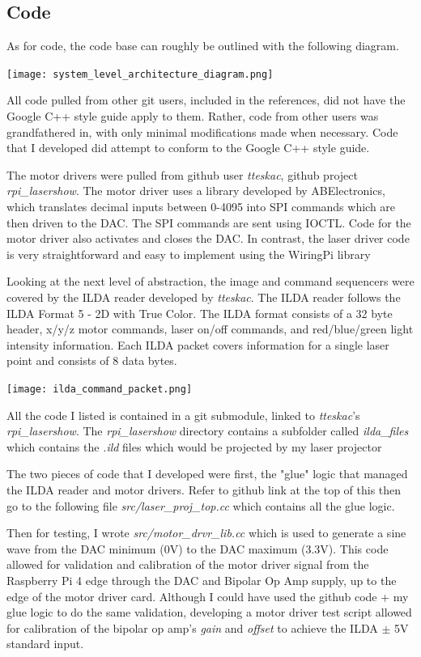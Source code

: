 \documentclass[journal]{IEEEtran}
\begin{document}
    \subsection{Code}

    As for code, the code base can roughly be outlined with the following diagram.

    \texttt{[image: system\_level\_architecture\_diagram.png]}

    All code pulled from other git users, included in the references, did not have the Google C++ style guide apply to them.
    Rather, code from other users was grandfathered in, with only minimal modifications made when necessary.
    Code that I developed did attempt to conform to the Google C++ style guide.

    The motor drivers were pulled from github user \emph{tteskac}, github project \emph{rpi\_lasershow}.
    The motor driver uses a library developed by ABElectronics, which translates decimal inputs between 0-4095 into SPI commands which are then driven to the DAC.
    The SPI commands are sent using IOCTL.
    Code for the motor driver also activates and closes the DAC.
    In contrast, the laser driver code is very straightforward and easy to implement using the WiringPi library

    Looking at the next level of abstraction, the image and command sequencers were covered by the ILDA reader developed by \emph{tteskac}.
    The ILDA reader follows the ILDA Format 5 - 2D with True Color.
    The ILDA format consists of a 32 byte header, x/y/z motor commands, laser on/off commands, and red/blue/green light intensity information.
    Each ILDA packet covers information for a single laser point and consists of 8 data bytes.

    \texttt{[image: ilda\_command\_packet.png]}

    All the code I listed is contained in a git submodule, linked to \emph{tteskac}'s \emph{rpi\_lasershow}. 
    The \emph{rpi\_lasershow} directory contains a subfolder called \emph{ilda\_files} which contains the \emph{.ild} files which would be projected by my laser projector

    The two pieces of code that I developed were first, the "glue" logic that managed the ILDA reader and motor drivers.
    Refer to github link at the top of this then go to the following file \emph{src/laser\_proj\_top.cc} which contains all the glue logic.

    Then for testing, I wrote \emph{src/motor\_drvr\_lib.cc} which is used to generate a sine wave from the DAC minimum (0V) to the DAC maximum (3.3V).
    This code allowed for validation and calibration of the motor driver signal from the Raspberry Pi 4 edge through the DAC and Bipolar Op Amp supply, up to the edge of the motor driver card.
    Although I could have used the github code + my glue logic to do the same validation, developing a motor driver test script allowed for calibration of the bipolar op amp's \emph{gain} and \emph{offset} to achieve the ILDA $\pm$ 5V standard input. 
\end{document}
